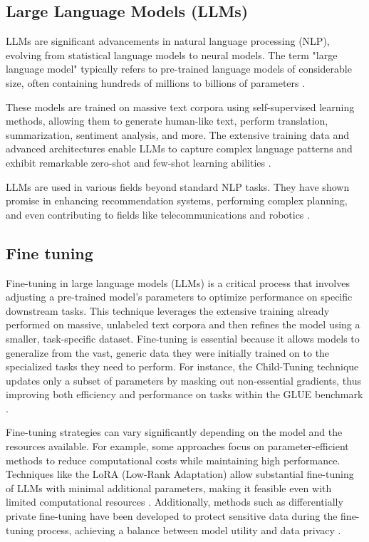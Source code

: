 \subsection*{Large Language Models (LLMs)}
LLMs are significant advancements in natural language processing (NLP), evolving from statistical language models to neural models. The term "large language model" typically refers to pre-trained language models of considerable size, often containing hundreds of millions to billions of parameters \cite{zhao2023survey}.

These models are trained on massive text corpora using self-supervised learning methods, allowing them to generate human-like text, perform translation, summarization, sentiment analysis, and more. The extensive training data and advanced architectures enable LLMs to capture complex language patterns and exhibit remarkable zero-shot and few-shot learning abilities \cite{naveed2024comprehensive}.

LLMs are used in various fields beyond standard NLP tasks. They have shown promise in enhancing recommendation systems, performing complex planning, and even contributing to fields like telecommunications and robotics \cite{10305960} \cite{fan2023fatellm}.

\subsection*{Fine tuning}
Fine-tuning in large language models (LLMs) is a critical process that involves adjusting a pre-trained model's parameters to optimize performance on specific downstream tasks. This technique leverages the extensive training already performed on massive, unlabeled text corpora and then refines the model using a smaller, task-specific dataset. Fine-tuning is essential because it allows models to generalize from the vast, generic data they were initially trained on to the specialized tasks they need to perform. For instance, the Child-Tuning technique updates only a subset of parameters by masking out non-essential gradients, thus improving both efficiency and performance on tasks within the GLUE benchmark \cite{xu-etal-2021-raise}.

Fine-tuning strategies can vary significantly depending on the model and the resources available. For example, some approaches focus on parameter-efficient methods to reduce computational costs while maintaining high performance. Techniques like the LoRA (Low-Rank Adaptation) allow substantial fine-tuning of LLMs with minimal additional parameters, making it feasible even with limited computational resources \cite{sun2023comparative}. Additionally, methods such as differentially private fine-tuning have been developed to protect sensitive data during the fine-tuning process, achieving a balance between model utility and data privacy \cite{yu2022differentially}.

